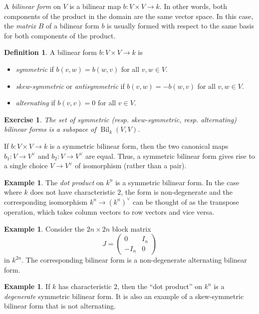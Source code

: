 \documentclass[12pt]{article}
\theoremstyle{plain}
\newtheorem{exercise}[theorem]{Exercise}
\theoremstyle{definition}
\newtheorem{definition}[theorem]{Definition}
\newtheorem{example}[theorem]{Example}
\theoremstyle{remark}
\numberwithin{equation}{section}
\begin{document}
A \emph{bilinear form} on $V$ is a bilinear map $b : V \times V \to k$.
In other words, both components of the product in the domain are the
same vector space.
In this case, the \emph{matrix} $B$ of a bilinear form $b$ is usually formed
with respect to the same basis for both components of the product.

\begin{definition}
A bilinear form $b: V \times V \to k$ is
\begin{itemize}
\item \emph{symmetric} if $b(v,w)=b(w,v)$ for all $v,w \in V$.
\item \emph{skew-symmetric} or \emph{antisymmetric}
if $b(v,w)=-b(w,v)$ for all $v,w \in V$.
\item \emph{alternating} if $b(v,v)=0$ for all $v \in V$.
\end{itemize}
\end{definition}

\begin{exercise}
The set of symmetric (resp. skew-symmetric, resp. alternating) bilinear
forms is a subspace of $\operatorname{Bil}_k(V,V)$.
\end{exercise}

If $b: V \times V \to k$ is a symmetric bilinear form,
then the two canonical maps $b_1 : V \to V^\vee$ and $b_2 : V \to
V^\vee$ are equal.  Thus, a symmetric bilinear form gives rise to
a single choice $V \to V^\vee$ of isomorphism (rather than a pair).

\begin{example}
The \emph{dot product} on $k^n$ is a symmetric bilinear form.
In the case where $k$ does not have characteristic $2$, the form is
non-degenerate and the corresponding isomorphism
$k^n \to (k^n)^\vee$ can be thought of as the
transpose operation, which takes column vectors to row vectors and vice
versa.
\end{example}

\begin{example}
Consider the $2n \times 2n$ block matrix
\[
J = \begin{pmatrix} 0 & I_n \\ -I_n & 0 \end{pmatrix} 
\]
in $k^{2n}$.
The corresponding bilinear form is a non-degenerate alternating bilinear
form.
\end{example}

\begin{example}
If $k$ has characteristic $2$, then the ``dot product''
on $k^n$ is a \emph{degenerate} symmetric bilinear form.
It is also an example of a skew-symmetric bilinear form that is not
alternating.
\end{example}
\end{document}
